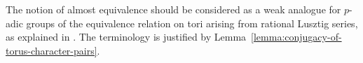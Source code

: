 \documentclass[reqno]{amsart}
\numberwithin{equation}{subsection}
\newcommand{\F}{\mathbf{F}}
\newcommand{\Q}{\mathbf{Q}}
\newcommand{\ol}[1]{\overline{#1}}
\newcommand{\co}{\colon}
\newcommand{\ld}{{}^L}
\newcommand\cA{\mathcal{A}}
\DeclareMathOperator{\Nm}{Nm}
\newtheorem{lemma}[thm]{Lemma}
\theoremstyle{remark}
\numberwithin{equation}{subsection}
\numberwithin{figure}{subsection}
\begin{document}
The notion of almost equivalence should be considered as a weak analogue for $p$-adic groups of the equivalence relation on tori arising from rational Lusztig series, as explained in \cite[\S 2.8]{Cot26b}. The terminology is justified by Lemma~\ref{lemma:conjugacy-of-torus-character-pairs}.


\end{document}
